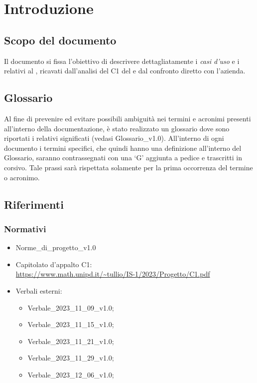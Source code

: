 \chapter{Introduzione} \label{cap:intro}
\section{Scopo del documento}
Il documento si fissa l'obiettivo di descrivere dettagliatamente i \emph{casi d’uso} e i  relativi al   , ricavati dall’analisi del  C1 del   e dal confronto diretto con l'azienda.
\section{Glossario}
Al fine di prevenire ed evitare possibili ambiguità nei termini e acronimi presenti all’interno della documentazione, è stato realizzato un glossario dove sono riportati i relativi significati (vedasi Glossario\_v1.0). All’interno di ogni documento i termini specifici, che quindi hanno una definizione all’interno del Glossario, saranno contrassegnati con una ‘G’ aggiunta a pedice e trascritti in corsivo. Tale prassi sarà rispettata solamente per la prima occorrenza del termine o acronimo.
\section{Riferimenti}
\subsection{Normativi}
\begin{itemize}
    \item Norme\_di\_progetto\_v1.0
    \item Capitolato d'appalto C1: \\ \url{https://www.math.unipd.it/~tullio/IS-1/2023/Progetto/C1.pdf}
    \item Verbali esterni:
        \begin{itemize}
            \item Verbale\_2023\_11\_09\_v1.0;
            \item Verbale\_2023\_11\_15\_v1.0;
            \item Verbale\_2023\_11\_21\_v1.0;
            \item Verbale\_2023\_11\_29\_v1.0;
            \item Verbale\_2023\_12\_06\_v1.0;
        \end{itemize}
\end{itemize}

